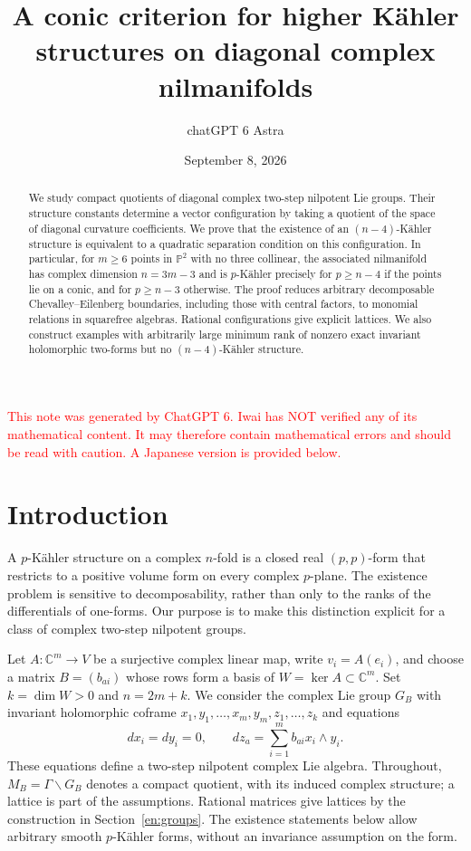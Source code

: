 \documentclass[12pt]{amsart}
\title[A conic criterion for diagonal complex nilmanifolds]{A conic criterion for higher K\"ahler structures on diagonal complex nilmanifolds}
\author{chatGPT 6 Astra}
\date{September 8, 2026}
\theoremstyle{definition}
\theoremstyle{remark}
\numberwithin{equation}{section}
\newcommand{\C}{\mathbb{C}}
\newcommand{\xr}[1]{\textcolor{red}{#1}}
\begin{document}
\begin{abstract}
We study compact quotients of diagonal complex two-step nilpotent Lie groups.
Their structure constants determine a vector configuration by taking a quotient
of the space of diagonal curvature coefficients. We prove that the existence of
an $(n-4)$-K\"ahler structure is equivalent to a quadratic separation condition
on this configuration. In particular, for $m\geq6$ points in $\mathbb P^2$ with
no three collinear, the associated nilmanifold has complex dimension $n=3m-3$
and is $p$-K\"ahler precisely for $p\geq n-4$ if the points lie on a conic,
and for $p\geq n-3$ otherwise. The proof reduces arbitrary decomposable
Chevalley--Eilenberg boundaries, including those with central factors, to
monomial relations in squarefree algebras. Rational configurations give explicit
lattices. We also construct examples with arbitrarily large minimum rank of
nonzero exact invariant holomorphic two-forms but no $(n-4)$-K\"ahler structure.
\end{abstract}
\maketitle
\xr{This note was generated by ChatGPT 6. Iwai has NOT verified any of its mathematical content. It may therefore contain mathematical errors and should be read with caution. A Japanese version is provided below.}

\section{Introduction}
A $p$-K\"ahler structure on a complex $n$-fold is a closed real $(p,p)$-form
that restricts to a positive volume form on every complex $p$-plane.
The existence problem is sensitive to decomposability, rather than only to
the ranks of the differentials of one-forms. Our purpose is to make this
distinction explicit for a class of complex two-step nilpotent groups.

Let $A:\C^m\longrightarrow V$ be a surjective complex linear map,
write $v_i=A(e_i)$, and choose a matrix $B=(b_{ai})$ whose rows form a basis
of $W=\ker A\subset\C^m$. Set $k=\dim W>0$ and $n=2m+k$.
We consider the complex Lie group $G_B$ with invariant holomorphic coframe
$x_1,y_1,\ldots,x_m,y_m,z_1,\ldots,z_k$ and equations
\begin{equation}\label{en:structure}
 dx_i=dy_i=0,\qquad dz_a=\sum_{i=1}^m b_{ai}x_i\wedge y_i.
\end{equation}
These equations define a two-step nilpotent complex Lie algebra. Throughout,
$M_B=\Gamma\backslash G_B$ denotes a compact quotient, with its induced
complex structure; a lattice is part of the assumptions. Rational matrices
give lattices by the construction in Section~\ref{en:groups}.
The existence statements below allow arbitrary smooth $p$-K\"ahler forms,
without an invariance assumption on the form.
\end{document}
